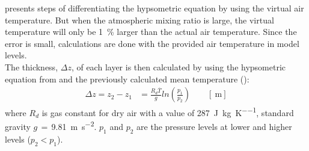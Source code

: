 \citet{martin_mid-latitude_2006} presents steps of differentiating the hypsometric equation by using the virtual air temperature. But when the atmospheric mixing ratio is large, the virtual temperature will only be \SI{1}{\percent} larger than the actual air temperature. Since the error is small, calculations are done with the provided air temperature in model levels.
\\
The thickness, $\Delta z$, of each layer is then calculated by using the hypsometric equation from \citet{martin_mid-latitude_2006} and the previously calculated mean temperature ():
\begin{equation}
\begin{split}
\Delta z  = z_2 - z_1 
& = \frac{R_d \overline{T}}{g} ln\left(\frac{p_1}{p_2} \right) \qquad [\SI{}{\metre}]
\end{split}
\label{eq:hypsometric}
\end{equation}
where $R_d$ is gas constant for dry air with a value of \SI{287}{\joule\per\kilogram\per\kelvin},  standard gravity $g\,=\,$\SI{9.81}{\metre\per\square\second}. $p_1$ and $p_2$ are the pressure levels at lower and higher levels %
($p_2 < p_1$).
\newpage
